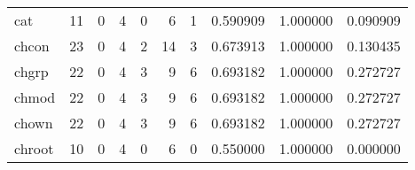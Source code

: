 \begin{longtable}{lrrrrrrrrr}
cat       &                                       11 &                                                  0 &                                                  4 &                                                  0 &                                                  6 &                                                  1 &                                           0.590909 &                               1.000000 &                             0.090909 \\
chcon     &                                       23 &                                                  0 &                                                  4 &                                                  2 &                                                 14 &                                                  3 &                                           0.673913 &                               1.000000 &                             0.130435 \\
chgrp     &                                       22 &                                                  0 &                                                  4 &                                                  3 &                                                  9 &                                                  6 &                                           0.693182 &                               1.000000 &                             0.272727 \\
chmod     &                                       22 &                                                  0 &                                                  4 &                                                  3 &                                                  9 &                                                  6 &                                           0.693182 &                               1.000000 &                             0.272727 \\
chown     &                                       22 &                                                  0 &                                                  4 &                                                  3 &                                                  9 &                                                  6 &                                           0.693182 &                               1.000000 &                             0.272727 \\
chroot    &                                       10 &                                                  0 &                                                  4 &                                                  0 &                                                  6 &                                                  0 &                                           0.550000 &                               1.000000 &                             0.000000 \\

\end{longtable}
